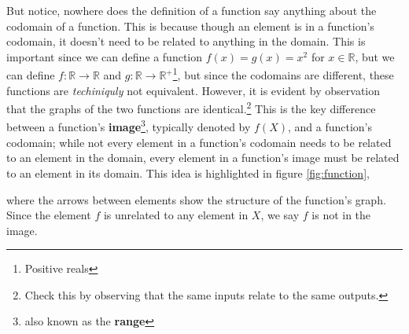 \documentclass[11pt]{article}
\numberwithin{lemma}{section}
\numberwithin{equation}{section}
\numberwithin{define}{section}
\numberwithin{prop}{section}
\numberwithin{figure}{section}
\numberwithin{theorem}{section}
\newcounter{ex}[section]
\numberwithin{ex}{section}
\def\real{\mathbb{R}}
\begin{document}
But notice, nowhere does the definition of a function say anything about the codomain of a function. 
This is because though an element is in a function's codomain, it doesn't need to be related to anything in the domain. This is important since we can define a function $f(x)=g(x)=x^2$ for $x\in\real$, but we can define $f:\real\to\real$ and $g:\real\to\real^+$\footnote{Positive reals}, but since the codomains are different, these functions are \textit{techiniquly} not equivalent. 
However, it is evident by observation that the graphs of the two functions are identical.\footnote{
Check this by observing that the same inputs relate to the same outputs.}
This is the key difference between a function's \textbf{image}\footnote{also known as the \textbf{range}}, typically denoted by $f(X)$, and a function's codomain;
while not every element in a function's codomain needs to be related to an element in the domain, every element in a function's image must be related to an element in its domain. This idea is highlighted in figure \eqref{fig:function}, 
\begin{figure}[h]
\centering
{}
	\caption{}
	\label{fig:function}
\end{figure}
where the arrows between elements show the structure of the function's graph. Since the element $f$ is unrelated to any element in $X$, we say $f$ is not in the image.
\end{document}
